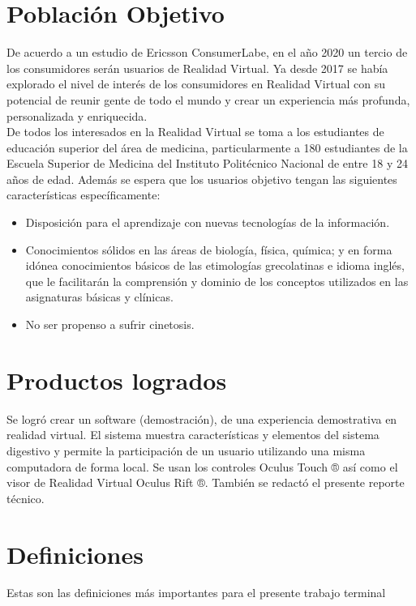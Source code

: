 \section{Población Objetivo}
De acuerdo a un estudio de Ericsson ConsumerLabe\cite{web3}, en el año 2020 un tercio de los consumidores serán usuarios de Realidad Virtual. Ya desde 2017 se había explorado el nivel de interés de los consumidores en Realidad Virtual\cite{web4} con su potencial de reunir gente de todo el mundo y crear un experiencia más profunda, personalizada y enriquecida.\\
\newline
De todos los interesados en la Realidad Virtual se toma a los estudiantes de educación superior del área de medicina, particularmente a 180\cite{ofi1}  estudiantes de la Escuela Superior de Medicina del Instituto Politécnico Nacional de entre 18 y 24 años de edad. Además se espera que los usuarios objetivo tengan las siguientes características\cite{web5} específicamente:\\
\newline
\begin{itemize}
\item Disposición para el aprendizaje con nuevas tecnologías de la información.
\item Conocimientos sólidos en las áreas de biología, física, química; y en forma idónea conocimientos básicos de las etimologías grecolatinas e idioma inglés, que le facilitarán la comprensión y dominio de los conceptos utilizados en las asignaturas básicas y clínicas.
\item No ser propenso a sufrir cinetosis.
\end{itemize}

\section{Productos logrados}
Se logró crear un software (demostración), de una experiencia demostrativa en realidad virtual. El sistema muestra características y elementos del sistema digestivo y permite la participación de un usuario utilizando una misma computadora de forma local. Se usan los controles Oculus Touch ® así como el visor de Realidad Virtual Oculus Rift ®. También se redactó el presente reporte técnico.

\section{Definiciones}
Estas son las definiciones más importantes para el presente trabajo terminal

